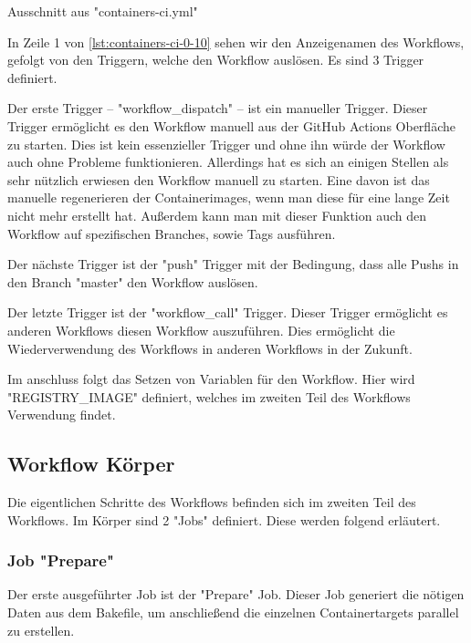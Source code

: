 \begin{listing}[H]
    \inputminted[firstline=0,lastline=10]{yaml}{./code-examples/containers-ci.yml}
    \caption{Ausschnitt aus "containers-ci.yml"}
    \label{lst:containers-ci-0-10}
\end{listing}

In Zeile 1 von \cref{lst:containers-ci-0-10} sehen wir den Anzeigenamen des Workflows, gefolgt von den Triggern, welche den Workflow auslösen. Es sind 3 Trigger definiert. 

Der erste Trigger – "workflow\_dispatch" – ist ein manueller Trigger. Dieser Trigger ermöglicht es den Workflow manuell aus der GitHub Actions Oberfläche zu starten. Dies ist kein essenzieller Trigger und ohne ihn würde der Workflow auch ohne Probleme funktionieren. Allerdings hat es sich an einigen Stellen als sehr nützlich erwiesen den Workflow manuell zu starten. Eine davon ist das manuelle regenerieren der Containerimages, wenn man diese für eine lange Zeit nicht mehr erstellt hat. Außerdem kann man mit dieser Funktion auch den Workflow auf spezifischen Branches, sowie Tags ausführen.

Der nächste Trigger ist der "push" Trigger mit der Bedingung, dass alle Pushs in den Branch "master" den Workflow auslösen.

Der letzte Trigger ist der "workflow\_call" Trigger. Dieser Trigger ermöglicht es anderen Workflows diesen Workflow auszuführen. Dies ermöglicht die Wiederverwendung des Workflows in anderen Workflows in der Zukunft. 

Im anschluss folgt das Setzen von Variablen für den Workflow. Hier wird "REGISTRY\_IMAGE" definiert, welches im zweiten Teil des Workflows Verwendung findet.

\subsection{Workflow Körper}

Die eigentlichen Schritte des Workflows befinden sich im zweiten Teil des Workflows. Im Körper sind 2 "Jobs" definiert. Diese werden folgend erläutert.

\subsubsection{Job "Prepare"} \label{ssec:job-prepare}

Der erste ausgeführter Job ist der "Prepare" Job. Dieser Job generiert die nötigen Daten aus dem Bakefile, um anschließend die einzelnen Containertargets parallel zu erstellen.

